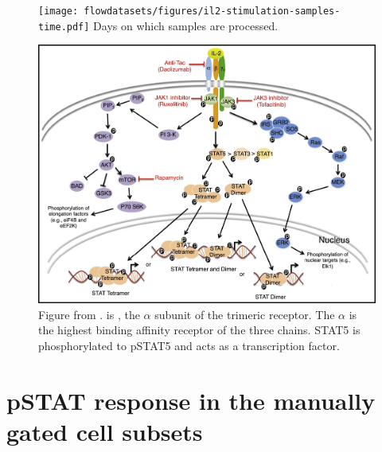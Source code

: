 \begin{figure}
\centering
\texttt{[image: flowdatasets/figures/il2-stimulation-samples-time.pdf]}
{ Days on which samples are processed. }
{
}
\end{figure}

\begin{figure}[h]
\centering
\includegraphics[scale=0.75]{IL2/figures/IL2-pathway.jpg}
{Figure from \citet{Liao:2013jt}.}
{
 is , the $\alpha$ subunit of the trimeric  receptor.
The $\alpha$ is the highest binding affinity receptor of the three chains.
STAT5 is phosphorylated to pSTAT5 and acts as a transcription factor.
}
\end{figure}


\section{pSTAT response in the manually gated cell subsets}


